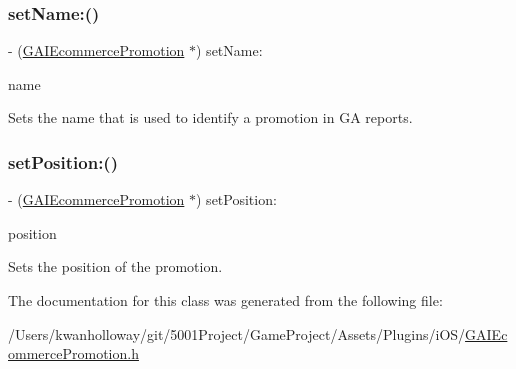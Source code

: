 \subsubsection{\texorpdfstring{set\+Name\+:()}{setName:()}}
{\footnotesize\ttfamily -\/ (\hyperlink{interface_g_a_i_ecommerce_promotion}{G\+A\+I\+Ecommerce\+Promotion} $\ast$) set\+Name\+: \begin{DoxyParamCaption}\item[{(N\+S\+String $\ast$)}]{name }\end{DoxyParamCaption}}

Sets the name that is used to identify a promotion in GA reports. \mbox{\label{interface_g_a_i_ecommerce_promotion_a4c5b7f359ac00a6f2438fb40bd98cc30}} 
\subsubsection{\texorpdfstring{set\+Position\+:()}{setPosition:()}}
{\footnotesize\ttfamily -\/ (\hyperlink{interface_g_a_i_ecommerce_promotion}{G\+A\+I\+Ecommerce\+Promotion} $\ast$) set\+Position\+: \begin{DoxyParamCaption}\item[{(N\+S\+String $\ast$)}]{position }\end{DoxyParamCaption}}

Sets the position of the promotion. 

The documentation for this class was generated from the following file\+:\begin{DoxyCompactItemize}
\item 
/\+Users/kwanholloway/git/5001\+Project/\+Game\+Project/\+Assets/\+Plugins/i\+O\+S/\hyperlink{_g_a_i_ecommerce_promotion_8h}{G\+A\+I\+Ecommerce\+Promotion.\+h}\end{DoxyCompactItemize}

